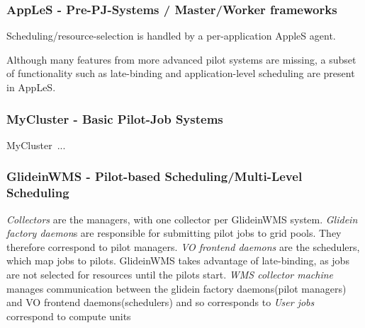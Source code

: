 \documentclass{sig-alternate}
\begin{document}
\subsubsection{AppLeS - Pre-PJ-Systems / Master/Worker frameworks}

Scheduling/resource-selection is handled by a per-application AppleS agent.

Although many features from more advanced pilot systems are missing, a subset
of \pilotjob functionality such as late-binding and 
application-level scheduling are present in AppLeS.


\subsubsection{MyCluster - Basic Pilot-Job Systems}
MyCluster~\cite{1652061}...

\subsubsection{GlideinWMS - Pilot-based Scheduling/Multi-Level Scheduling}
\textit{Collectors} are the managers, with one collector per
GlideinWMS system.
\textit{Glidein factory daemon}s are responsible for
submitting pilot jobs to grid pools.
They therefore correspond to pilot managers.
\textit{VO frontend daemons} are the schedulers, which map jobs
to pilots.  GlideinWMS takes advantage of late-binding, as
jobs are not selected for resources until the pilots start.
\textit{WMS collector machine} manages communication between the glidein
factory daemons(pilot managers) and VO frontend daemons(schedulers)
and so corresponds to 
\textit{User jobs} correspond to compute units 
\end{document}
